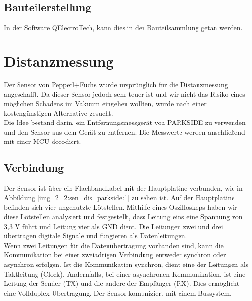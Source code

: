 \newpage

\subsection{Bauteilerstellung}

In der Software QElectroTech, kann dies in der Bauteilsammlung getan werden.


\section{Distanzmessung}



Der Sensor von Pepperl+Fuchs wurde ursprünglich für die Distanzmessung angeschafft. Da dieser Sensor jedoch sehr teuer ist und wir nicht das Risiko eines möglichen Schadens im Vakuum eingehen wollten, wurde nach einer kostengünstigen Alternative gesucht.\\
Die Idee bestand darin, ein Entfernungsmessgerät von PARKSIDE zu verwenden und den Sensor aus dem Gerät zu entfernen. Die Messwerte werden anschließend mit einer MCU decodiert.

\subsection{Verbindung}
Der Sensor ist über ein Flachbandkabel mit der Hauptplatine verbunden, wie in Abbildung \ref{img_2_2:sen_dis_parkside:1} zu sehen ist. Auf der Hauptplatine befinden sich vier ungenutzte Lötstellen. Mithilfe eines Oszilloskops haben wir diese Lötstellen analysiert und festgestellt, dass Leitung eins eine Spannung von 3,3 V führt und Leitung vier als GND dient. Die Leitungen zwei und drei übertragen digitale Signale und fungieren als Datenleitungen.\\
Wenn zwei Leitungen für die Datenübertragung vorhanden sind, kann die Kommunikation bei einer zweiadrigen Verbindung entweder synchron oder asynchron erfolgen. Ist die Kommunikation synchron, dient eine der Leitungen als Taktleitung (Clock). Andernfalls, bei einer asynchronen Kommunikation, ist eine Leitung der Sender (TX) und die andere der Empfänger (RX). Dies ermöglicht eine Vollduplex-Übertragung.
Der Sensor komuniziert mit einem Bussystem.




